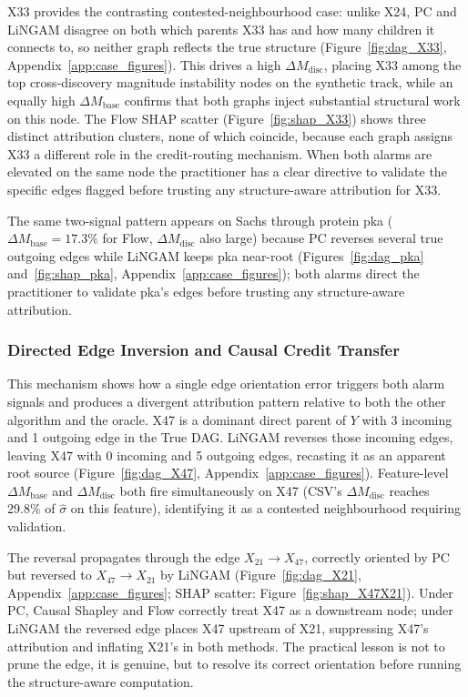 \documentclass[12pt,letterpaper,twocolumn]{article}
\begin{document}
X33 provides the contrasting contested-neighbourhood case: unlike X24, PC and LiNGAM
disagree on both which parents X33 has and how many children it connects to, so neither
graph reflects the true structure (Figure~\ref{fig:dag_X33}, Appendix~\ref{app:case_figures}). This drives a high $\Delta M_{\text{disc}}$, placing
X33 among the top cross-discovery magnitude instability nodes on the synthetic track,
while an equally high $\Delta M_{\text{base}}$ confirms that both graphs inject
substantial structural work on this node. The Flow SHAP scatter (Figure~\ref{fig:shap_X33}) shows three distinct
attribution clusters, none of which coincide, because each graph assigns X33 a
different role in the credit-routing mechanism. When both alarms are elevated on the
same node the practitioner has a clear directive to validate the specific edges flagged
before trusting any structure-aware attribution for X33.

The same two-signal pattern appears on Sachs through protein pka ($\Delta M_{\text{base}}
= 17.3\%$ for Flow, $\Delta M_{\text{disc}}$ also large) because PC reverses several true
outgoing edges while LiNGAM keeps pka near-root (Figures~\ref{fig:dag_pka} and~\ref{fig:shap_pka}, Appendix~\ref{app:case_figures}); both alarms direct the practitioner to
validate pka's edges before trusting any structure-aware attribution.

\subsubsection{Directed Edge Inversion and Causal Credit Transfer}

This mechanism shows how a single edge orientation error triggers both alarm signals and
produces a divergent attribution pattern relative to both the other algorithm and the
oracle. X47 is a dominant direct parent of $Y$ with 3 incoming and 1 outgoing edge in
the True DAG. LiNGAM reverses those incoming edges, leaving X47 with 0 incoming and 5
outgoing edges, recasting it as an apparent root source (Figure~\ref{fig:dag_X47}, Appendix~\ref{app:case_figures}). Feature-level
$\Delta M_{\text{base}}$ and $\Delta M_{\text{disc}}$ both fire simultaneously on X47
(CSV's $\Delta M_{\text{disc}}$ reaches 29.8\% of $\hat{\sigma}$ on this feature),
identifying it as a contested neighbourhood requiring validation.

The reversal propagates through the edge $X_{21} \to X_{47}$, correctly oriented by PC
but reversed to $X_{47} \to X_{21}$ by LiNGAM
(Figure~\ref{fig:dag_X21}, Appendix~\ref{app:case_figures}; SHAP scatter: Figure~\ref{fig:shap_X47X21}). Under PC, Causal Shapley and Flow
correctly treat X47 as a downstream node; under LiNGAM the reversed edge places X47
upstream of X21, suppressing X47's attribution and inflating X21's in both methods. The
practical lesson is not to prune the edge, it is genuine, but to resolve its correct
orientation before running the structure-aware computation.
\end{document}
